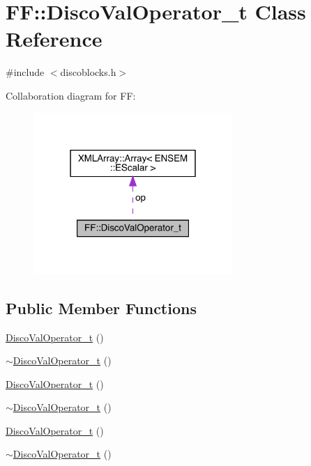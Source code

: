 \hypertarget{classFF_1_1DiscoValOperator__t}{}\section{FF\+:\+:Disco\+Val\+Operator\+\_\+t Class Reference}
\label{classFF_1_1DiscoValOperator__t}


{\ttfamily \#include $<$discoblocks.\+h$>$}



Collaboration diagram for FF\+:\nopagebreak
\begin{figure}[H]
\begin{center}
\leavevmode
\includegraphics[width=214pt]{d5/d04/classFF_1_1DiscoValOperator__t__coll__graph}
\end{center}
\end{figure}
\subsection*{Public Member Functions}
\begin{DoxyCompactItemize}
\item 
\mbox{\hyperlink{classFF_1_1DiscoValOperator__t_a818e9637a1ac97359f1e611f1f524761}{Disco\+Val\+Operator\+\_\+t}} ()
\item 
\mbox{\hyperlink{classFF_1_1DiscoValOperator__t_aff2684b99129c3fa09b915d69abeb421}{$\sim$\+Disco\+Val\+Operator\+\_\+t}} ()
\item 
\mbox{\hyperlink{classFF_1_1DiscoValOperator__t_a818e9637a1ac97359f1e611f1f524761}{Disco\+Val\+Operator\+\_\+t}} ()
\item 
\mbox{\hyperlink{classFF_1_1DiscoValOperator__t_aff2684b99129c3fa09b915d69abeb421}{$\sim$\+Disco\+Val\+Operator\+\_\+t}} ()
\item 
\mbox{\hyperlink{classFF_1_1DiscoValOperator__t_a818e9637a1ac97359f1e611f1f524761}{Disco\+Val\+Operator\+\_\+t}} ()
\item 
\mbox{\hyperlink{classFF_1_1DiscoValOperator__t_aff2684b99129c3fa09b915d69abeb421}{$\sim$\+Disco\+Val\+Operator\+\_\+t}} ()
\end{DoxyCompactItemize}
